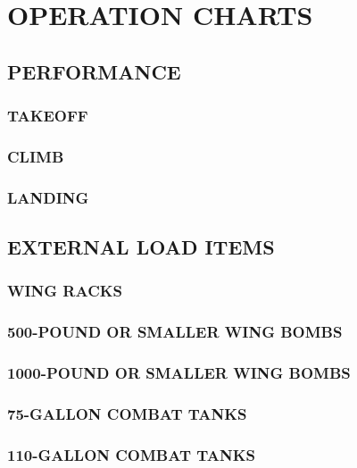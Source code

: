 \chapter{OPERATION CHARTS}
\minitoc{}
\cleardoublepage{}


\section{PERFORMANCE}
\subsection{TAKEOFF}
\subsection{CLIMB}
\subsection{LANDING}


\section{EXTERNAL LOAD ITEMS}
\subsection{WING RACKS}
\subsection{500-POUND OR SMALLER WING BOMBS}
\subsection{1000-POUND OR SMALLER WING BOMBS}
\subsection{75-GALLON COMBAT TANKS}
\subsection{110-GALLON COMBAT TANKS}


\cleardoublepage{}
